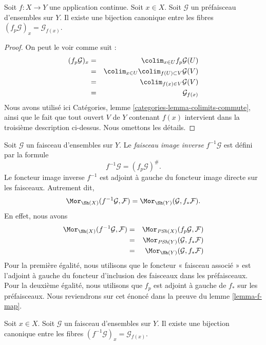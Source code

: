 \begin{lemma}
\label{lemma-stalk-pullback-presheaf}
Soit $f : X \to Y$ une application continue.
Soit $x \in X$. Soit $\mathcal{G}$ un préfaisceau d'ensembles sur $Y$.
Il existe une bijection canonique entre les fibres
$(f_p\mathcal{G})_x = \mathcal{G}_{f(x)}$.
\end{lemma}

\begin{proof}
On peut le voir comme suit :
\begin{eqnarray*}
(f_p\mathcal{G})_x
& = &
\colim_{x \in U} f_p\mathcal{G}(U) \\
& = &
\colim_{x \in U} \colim_{f(U) \subset V} \mathcal{G}(V) \\
& = &
\colim_{f(x) \in V} \mathcal{G}(V) \\
& = &
\mathcal{G}_{f(x)}
\end{eqnarray*}
Nous avons utilisé ici
Catégories, lemme \ref{categories-lemma-colimits-commute},
ainsi que le fait que tout ouvert $V$ de $Y$ contenant $f(x)$
intervient dans la troisième description ci-dessus. Nous omettons les détails.
\end{proof}

\noindent
Soit $\mathcal{G}$ un faisceau d'ensembles sur $Y$.
Le {\it faisceau image inverse} $f^{-1}\mathcal{G}$ est défini
par la formule
$$
f^{-1}\mathcal{G} = (f_p\mathcal{G})^\# .
$$
Le foncteur image inverse $f^{-1}$ est adjoint à gauche du
foncteur image directe sur les faisceaux. Autrement dit,
$$
\Mor_{\Sh(X)}(f^{-1}\mathcal{G}, \mathcal{F})
=
\Mor_{\Sh(Y)}(\mathcal{G}, f_*\mathcal{F}).
$$
En effet, nous avons
\begin{eqnarray*}
\Mor_{\Sh(X)}(f^{-1}\mathcal{G}, \mathcal{F})
& = &
\Mor_{\textit{PSh}(X)}(f_p\mathcal{G}, \mathcal{F}) \\
& = &
\Mor_{\textit{PSh}(Y)}(\mathcal{G}, f_*\mathcal{F}) \\
& = &
\Mor_{\Sh(Y)}(\mathcal{G}, f_*\mathcal{F})
\end{eqnarray*}
Pour la première égalité, nous utilisons que le foncteur « faisceau associé » est l'adjoint à gauche
du foncteur d'inclusion des faisceaux dans les préfaisceaux. Pour la deuxième égalité,
nous utilisons que $f_p$ est adjoint à gauche de $f_*$ sur les préfaisceaux. Nous reviendrons
sur cet énoncé dans la preuve du lemme \ref{lemma-f-map}.

\begin{lemma}
\label{lemma-stalk-pullback}
Soit $x \in X$. Soit $\mathcal{G}$ un faisceau d'ensembles sur $Y$.
Il existe une bijection canonique entre les fibres
$(f^{-1}\mathcal{G})_x = \mathcal{G}_{f(x)}$.
\end{lemma}

